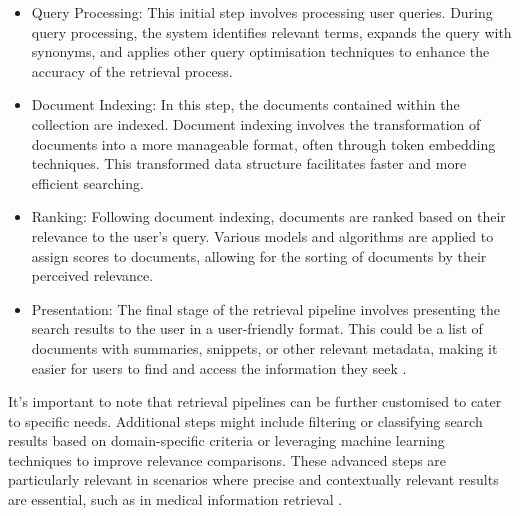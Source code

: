 \begin{itemize}
    \item Query Processing: This initial step involves processing user queries. During query processing, the system identifies relevant terms, expands the query with synonyms, and applies other query optimisation techniques to enhance the accuracy of the retrieval process.
    \item Document Indexing: In this step, the documents contained within the collection are indexed. Document indexing involves the transformation of documents into a more manageable format, often through token embedding techniques. This transformed data structure facilitates faster and more efficient searching.
    \item Ranking: Following document indexing, documents are ranked based on their relevance to the user's query. Various models and algorithms are applied to assign scores to documents, allowing for the sorting of documents by their perceived relevance.
    \item Presentation: The final stage of the retrieval pipeline involves presenting the search results to the user in a user-friendly format. This could be a list of documents with summaries, snippets, or other relevant metadata, making it easier for users to find and access the information they seek \cite{chen, zendel}.
\end{itemize}

It's important to note that retrieval pipelines can be further customised to cater to specific needs. Additional steps might include filtering or classifying search results based on domain-specific criteria or leveraging machine learning techniques to improve relevance comparisons. These advanced steps are particularly relevant in scenarios where precise and contextually relevant results are essential, such as in medical information retrieval \cite{lu}.